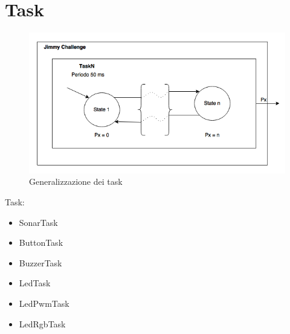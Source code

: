 \chapter{Task}

\begin{figure}[!ht]
	\centering
	\includegraphics[scale=.60]{img/task_generic.png}
	\caption{Generalizzazione dei task}
\end{figure}

Task:
\begin{itemize}
	\item SonarTask
	\item ButtonTask
	\item BuzzerTask
	\item LedTask
	\item LedPwmTask
	\item LedRgbTask
\end{itemize}